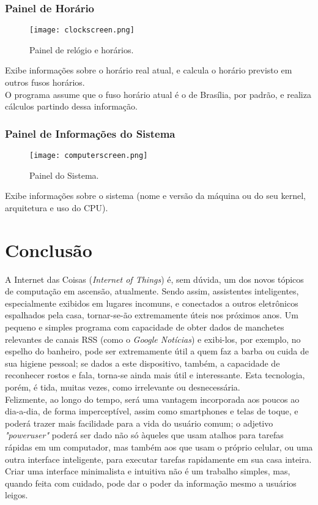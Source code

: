\documentclass[oneside,a4paper]{abntex2}       %
\begin{document}
\subsection{Painel de Horário}
\begin{figure}[H]
\centering
\texttt{[image: clockscreen.png]}
\caption{Painel de relógio e horários.}
\end{figure}

Exibe informações sobre o horário real atual, e calcula o horário previsto em outros fusos horários.\\
O programa assume que o fuso horário atual é o de Brasília, por padrão, e realiza cálculos partindo dessa informação.

\subsection{Painel de Informações do Sistema}
\begin{figure}[H]
\centering
\texttt{[image: computerscreen.png]}
\caption{Painel do Sistema.}
\end{figure}

Exibe informações sobre o sistema (nome e versão da máquina ou do seu kernel, arquitetura e uso do CPU).

\chapter{Conclusão}
A Internet das Coisas (\textit{Internet of Things}) é, sem dúvida, um dos novos tópicos de computação em ascensão, atualmente. Sendo assim, assistentes inteligentes, especialmente exibidos em lugares incomuns, e conectados a outros eletrônicos espalhados pela casa, tornar-se-ão extremamente úteis nos próximos anos. Um pequeno e simples programa com capacidade de obter dados de manchetes relevantes de canais RSS (como o \textit{Google Notícias}) e exibi-los, por exemplo, no espelho do banheiro, pode ser extremamente útil a quem faz a barba ou cuida de sua higiene pessoal; se dados a este dispositivo, também, a capacidade de reconhecer rostos e fala, torna-se ainda mais útil e interessante. Esta tecnologia, porém, é tida, muitas vezes, como irrelevante ou desnecessária.\\Felizmente, ao longo do tempo, será uma vantagem incorporada aos poucos ao dia-a-dia, de forma imperceptível, assim como smartphones e telas de toque, e poderá trazer mais facilidade para a vida do usuário comum; o adjetivo \textit{"poweruser"} poderá ser dado não só àqueles que usam atalhos para tarefas rápidas em um computador, mas também aos que usam o próprio celular, ou uma outra interface inteligente, para executar tarefas rapidamente em sua casa inteira.\\
Criar uma interface minimalista e intuitiva não é um trabalho simples, mas, quando feita com cuidado, pode dar o poder da informação mesmo a usuários leigos.

\end{document}
